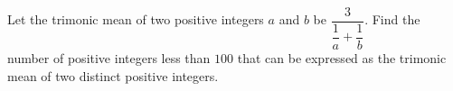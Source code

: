 Let the trimonic mean of two positive integers $a$ and $b$ be $\dfrac{3}{\dfrac{1}{a}+\dfrac{1}{b}}$. Find the number of positive integers less than $100$ that can be expressed as the trimonic mean of two distinct positive integers.
